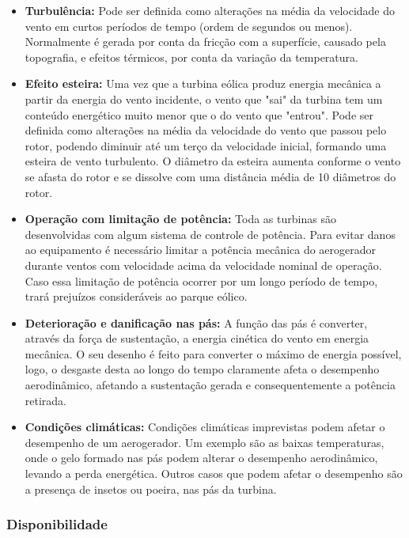 \begin{itemize}
  \item \textbf{Turbulência:} Pode ser definida como alterações na média da velocidade do vento em curtos períodos de tempo (ordem de segundos ou menos). Normalmente é gerada por conta da fricção com a superfície, causado pela topografia, e efeitos térmicos, por conta da variação da temperatura.
  \item \textbf{Efeito esteira:} Uma vez que a turbina eólica produz energia mecânica a partir da energia do vento incidente, o vento que "sai" da turbina tem um conteúdo energético muito menor que o do vento que "entrou". Pode ser definida como alterações na média da velocidade do vento que passou pelo rotor, podendo diminuir até um terço da velocidade inicial, formando uma esteira de vento turbulento. O diâmetro da esteira aumenta conforme o vento se afasta do rotor e se dissolve com uma distância média de 10 diâmetros do rotor.
  \item \textbf{Operação com limitação de potência:} Toda as turbinas são desenvolvidas com algum sistema de controle de potência. Para evitar danos ao equipamento é necessário limitar a potência mecânica do aerogerador durante ventos com velocidade acima da velocidade nominal de operação. Caso essa limitação de potência ocorrer por um longo período de tempo, trará prejuízos consideráveis ao parque eólico.
  \item \textbf{Deterioração e danificação nas pás:} A função das pás é converter, através da força de sustentação, a energia cinética do vento em energia mecânica. O seu desenho é feito para converter o máximo de energia possível, logo, o desgaste desta ao longo do tempo claramente afeta o desempenho aerodinâmico, afetando a sustentação gerada e consequentemente a potência retirada.
  \item \textbf{Condições climáticas:} Condições climáticas imprevistas podem afetar o desempenho de um aerogerador. Um exemplo são as baixas temperaturas, onde o gelo formado nas pás podem alterar o desempenho aerodinâmico, levando a perda energética. Outros casos que podem afetar o desempenho são a presença de insetos ou poeira, nas pás da turbina.
\end{itemize}

\subsubsection{Disponibilidade}
\label{Sec:disponibilidadeDesempenhoAerogeradores}

